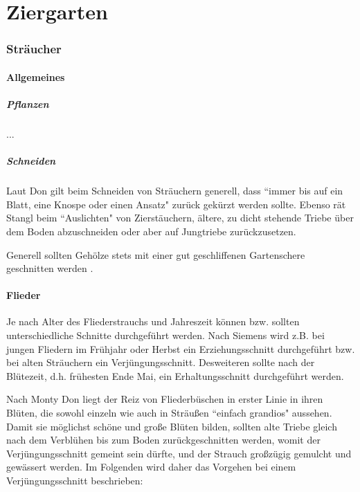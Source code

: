 \part{Ziergarten}

\pagebreak

\section{Sträucher}
\label{Sträucher}

\subsection{Allgemeines}

\subsubsection{Pflanzen}

...

\subsubsection{Schneiden}

Laut Don \cite[S.~257]{Don2021} gilt beim Schneiden von Sträuchern generell, dass ``immer bis auf ein Blatt, eine Knospe oder einen Ansatz" zurück gekürzt werden sollte.
Ebenso rät Stangl \cite[S.~256]{Stangl1995} beim ``Auslichten" von Zierstäuchern, ältere, zu dicht stehende Triebe über dem Boden abzuschneiden oder aber auf Jungtriebe zurückzusetzen.

Generell sollten Gehölze stets mit einer gut geschliffenen Gartenschere geschnitten werden \cite[S.~257]{Don2021}.

\subsection{Flieder}

Je nach Alter des Fliederstrauchs und Jahreszeit können bzw. sollten unterschiedliche Schnitte durchgeführt werden.
Nach Siemens \cite{Siemens2021} wird z.B. bei jungen Fliedern im Frühjahr oder Herbst ein Erziehungsschnitt durchgeführt bzw. bei alten Sträuchern ein Verjüngungsschnitt.
Desweiteren sollte nach der Blütezeit, d.h. frühesten Ende Mai, ein Erhaltungsschnitt durchgeführt werden.

Nach Monty Don \cite[S.~258]{Don2021} liegt der Reiz von Fliederbüschen in erster Linie in ihren Blüten, die sowohl einzeln wie auch in Sträußen ``einfach grandios" aussehen.
Damit sie möglichst schöne und große Blüten bilden, sollten alte Triebe gleich nach dem Verblühen bis zum Boden zurückgeschnitten werden, womit der Verjüngungsschnitt gemeint sein dürfte, und der Strauch großzügig gemulcht und gewässert werden.
Im Folgenden wird daher das Vorgehen bei einem Verjüngungsschnitt beschrieben:

